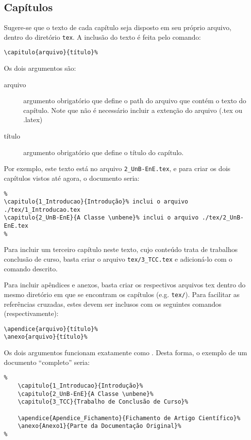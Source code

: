 \subsection{Capítulos}
Sugere-se que o texto de cada capítulo seja disposto em seu próprio arquivo, dentro do diretório 
\texttt{tex}. A inclusão do texto é feita pelo comando:
\begin{verbatim}
\capitulo{arquivo}{título}%
\end{verbatim}

Os dois argumentos são:
\begin{description}%
	\item[arquivo] argumento obrigatório que define o path do arquivo que contém o texto do 
	capítulo. 
	Note que não é necessário incluir a extenção do arquivo (.tex ou .latex)
	\item[título] argumento obrigatório que define o título do capítulo.
\end{description}%

Por exemplo, este texto está no arquivo \texttt{2\_UnB-EnE.tex}, e para criar os dois capítulos
vistos até agora, o documento seria:

\begin{verbatim}
%
\capitulo{1_Introducao}{Introdução}% inclui o arquivo ./tex/1_Introducao.tex
\capitulo{2_UnB-EnE}{A Classe \unbene}% inclui o arquivo ./tex/2_UnB-EnE.tex
%
\end{verbatim}

Para incluir um terceiro capítulo neste texto, cujo conteúdo trata de trabalhos conclusão de curso,
basta criar o arquivo \texttt{tex/3\_TCC.tex} e adicioná-lo com o comando descrito.

Para incluir apêndices e anexos, basta criar os respectivos arquivos tex dentro do mesmo diretório
em que se encontram os capítulos (e.g. \texttt{tex/}). Para facilitar as referências cruzadas,
estes devem ser inclusos com os seguintes comandos (respectivamente):
\begin{verbatim}
\apendice{arquivo}{título}%
\anexo{arquivo}{título}%
\end{verbatim}

Os dois argumentos funcionam exatamente como . Desta forma, o exemplo de um
documento ``completo'' seria: %

\begin{verbatim}
%
	\capitulo{1_Introducao}{Introdução}%
	\capitulo{2_UnB-EnE}{A Classe \unbene}%
	\capitulo{3_TCC}{Trabalho de Conclusão de Curso}%

	\apendice{Apendice_Fichamento}{Fichamento de Artigo Científico}%
	\anexo{Anexo1}{Parte da Documentação Original}%
%
\end{verbatim}

